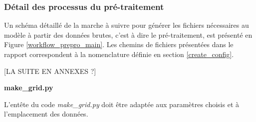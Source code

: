 \documentclass[10pt,a4paper,titlepage]{article}
\begin{document}

\subsubsection{Détail des processus du pré-traitement}
Un schéma détaillé de la marche à suivre pour générer les fichiers nécessaires au modèle à partir des données brutes, c'est à dire le pré-traitement, est présenté en Figure \ref{workflow_prepro_main}.
Les chemins de fichiers présentées dans le rapport correspondent à la nomenclature définie en section \ref{create_config}.


[LA SUITE EN ANNEXES ?]

\textbf{make\_grid.py}

L'entête du code \textit{make\_grid.py} doit être adaptée aux paramètres choisis et à l'emplacement des données.
\end{document}
